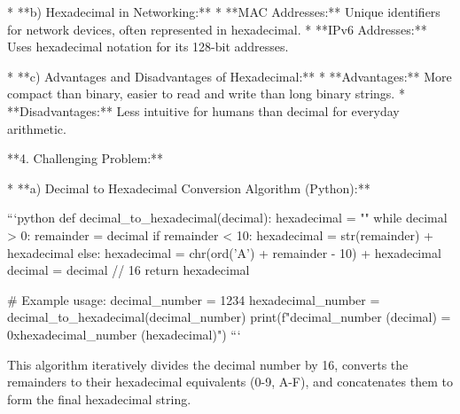 *   **b) Hexadecimal in Networking:**
    *   **MAC Addresses:** Unique identifiers for network devices, often represented in hexadecimal.
    *   **IPv6 Addresses:** Uses hexadecimal notation for its 128-bit addresses.

*   **c) Advantages and Disadvantages of Hexadecimal:**
    *   **Advantages:** More compact than binary, easier to read and write than long binary strings.
    *   **Disadvantages:** Less intuitive for humans than decimal for everyday arithmetic.

**4. Challenging Problem:**

*   **a) Decimal to Hexadecimal Conversion Algorithm (Python):**

```python
def decimal_to_hexadecimal(decimal):
    hexadecimal = ""
    while decimal > 0:
        remainder = decimal %
        if remainder < 10:
            hexadecimal = str(remainder) + hexadecimal
        else:
            hexadecimal = chr(ord('A') + remainder - 10) + hexadecimal
        decimal = decimal // 16
    return hexadecimal

# Example usage:
decimal_number = 1234
hexadecimal_number = decimal_to_hexadecimal(decimal_number)
print(f"{decimal_number} (decimal) = 0x{hexadecimal_number} (hexadecimal)")
```

This algorithm iteratively divides the decimal number by 16, converts the remainders to their hexadecimal equivalents (0-9, A-F), and concatenates them to form the final hexadecimal string.
